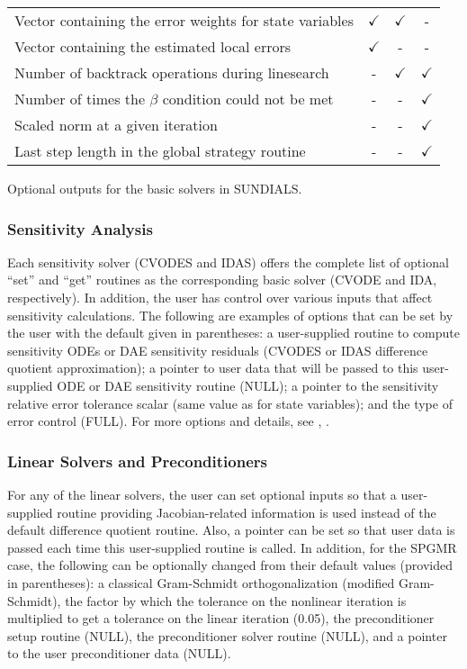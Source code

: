 \begin{acmtable}{327pt}
\begin{tabular}{p{2.75in} c c c }
Vector containing the error weights for state variables & $\checkmark$ & $\checkmark$ & - \\
Vector containing the estimated local errors & $\checkmark$ & - & - \\
Number of backtrack operations during linesearch & - & $\checkmark$ & $\checkmark$ \\
Number of times the $\beta$ condition could not be met & - & - & $\checkmark$ \\
Scaled norm at a given iteration & - & - & $\checkmark$ \\
Last step length in the global strategy routine & - & - & $\checkmark$ \\
\end{tabular}
\caption{Optional outputs for the basic solvers in SUNDIALS.}
\label{t:optional_output}
\end{acmtable}

\subsubsection*{Sensitivity Analysis}

Each sensitivity solver (CVODES and IDAS) offers the complete list of
optional ``set'' and ``get'' routines as the corresponding basic solver (CVODE
and IDA, respectively). In addition, the user has control over various
inputs that affect sensitivity calculations. 
The following are examples of options that can be set by the user
with the default given in parentheses: a user-supplied routine
to compute sensitivity ODEs or DAE sensitivity residuals (CVODES or
IDAS difference quotient approximation); a pointer to user data that
will be passed to this user-supplied ODE or DAE sensitivity routine (NULL); a
pointer to the sensitivity relative error tolerance scalar (same value as
for state variables); and the type of error control (FULL).
For more options and details, see \cite{SeHi:03}, \cite{HiSe:02}.

\subsubsection*{Linear Solvers and Preconditioners}

For any of the linear solvers, the user can set optional inputs so 
that a user-supplied routine providing Jacobian-related information
is used instead of the default difference quotient routine. 
Also, a pointer can be set so that user data is passed each time this
user-supplied routine is called. In addition, for the SPGMR case,
the following can be optionally changed from their default values
(provided in parentheses): a classical Gram-Schmidt orthogonalization 
(modified Gram-Schmidt), the factor by which the tolerance on the
nonlinear iteration is multiplied to get a tolerance on the linear
iteration (0.05), the preconditioner setup routine (NULL), the
preconditioner solver routine (NULL), and a pointer to the user
preconditioner data (NULL).

